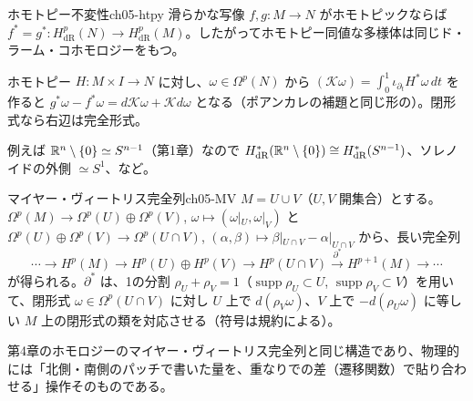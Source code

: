 \begin{mythm}{ホモトピー不変性}{ch05-htpy}
滑らかな写像 $f,g\colon M\to N$ がホモトピックならば $f^*=g^*\colon H^p_{\mathrm{dR}}(N)\to H^p_{\mathrm{dR}}(M)$。したがってホモトピー同値な多様体は同じド・ラーム・コホモロジーをもつ。
\end{mythm}
\begin{note}
ホモトピー $H\colon M\times I\to N$ に対し、$\omega\in\Omega^p(N)$ から $(\mathcal K\omega)=\int_0^1\iota_{\partial_t}H^*\omega\,dt$ を作ると $g^*\omega-f^*\omega=d\mathcal K\omega+\mathcal Kd\omega$ となる（ポアンカレの補題と同じ形の）。閉形式なら右辺は完全形式。
\end{note}
例えば $\mathbb{R}^n\setminus\{0\}\simeq S^{n-1}$（第1章）なので $H^*_{\mathrm{dR}}(\mathbb{R}^n\setminus\{0\})\cong H^*_{\mathrm{dR}}(S^{n-1})$、ソレノイドの外側 $\simeq S^1$、など。

\begin{mythm}{マイヤー・ヴィートリス完全列}{ch05-MV}
$M=U\cup V$（$U,V$ 開集合）とする。$\Omega^p(M)\to\Omega^p(U)\oplus\Omega^p(V)$, $\omega\mapsto(\omega|_U,\omega|_V)$ と $\Omega^p(U)\oplus\Omega^p(V)\to\Omega^p(U\cap V)$, $(\alpha,\beta)\mapsto\beta|_{U\cap V}-\alpha|_{U\cap V}$ から、長い完全列
\[
\cdots\to H^p(M)\to H^p(U)\oplus H^p(V)\to H^p(U\cap V)\xrightarrow{\ \partial^*\ }H^{p+1}(M)\to\cdots
\]
が得られる。$\partial^*$ は、1の分割 $\rho_U+\rho_V=1$（$\operatorname{supp}\rho_U\subset U$, $\operatorname{supp}\rho_V\subset V$）を用いて、閉形式 $\omega\in\Omega^p(U\cap V)$ に対し $U$ 上で $d(\rho_V\omega)$、$V$ 上で $-d(\rho_U\omega)$ に等しい $M$ 上の閉形式の類を対応させる（符号は規約による）。
\end{mythm}
第4章のホモロジーのマイヤー・ヴィートリス完全列と同じ構造であり、物理的には「北側・南側のパッチで書いた量を、重なりでの差（遷移関数）で貼り合わせる」操作そのものである。

